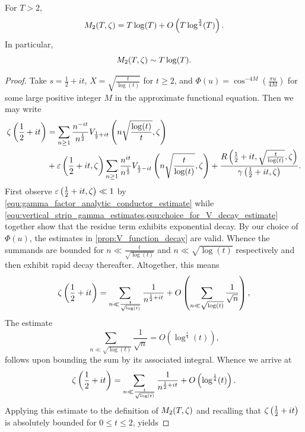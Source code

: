     \begin{theorem}\label{thm:second_moment_of_Riemann_zeta_asymptotic_equivalence}
      For \(T > 2\),
      \[
        M_{2}(T,\zeta) = T\log(T)+O\left(T\log^{\frac{3}{4}}(T)\right).
      \]
      In particular,
      \[
        M_{2}(T,\zeta) \sim T\log(T).
      \]
    \end{theorem}
    \begin{proof}
      Take \(s = \frac{1}{2}+it\), \(X = \sqrt{\frac{t}{\log(t)}}\) for \(t \ge 2\), and \(\Phi(u) = \cos^{-4M}\left(\frac{\pi u}{4M}\right)\) for some large positive integer \(M\) in the approximate functional equation. Then we may write
      \begin{align*}
        \zeta\left(\frac{1}{2}+it\right) &= \sum_{n \ge 1}\frac{n^{-it}}{n^{\frac{1}{2}}}V_{\frac{1}{2}+it}\left(n\sqrt{\frac{\log(t)}{t}},\zeta\right) \\
        &+ \varepsilon\left(\frac{1}{2}+it,\zeta\right)\sum_{n \ge 1}\frac{n^{it}}{n^{\frac{1}{2}}}V_{\frac{1}{2}-it}\left(n\sqrt{\frac{t}{\log(t)}},\zeta\right)+\frac{R\left(\frac{1}{2}+it,\sqrt{\frac{t}{\log(t)}},\zeta\right)}{\gamma\left(\frac{1}{2}+it,\zeta\right)}.
      \end{align*}
      First observe \(\varepsilon\left(\frac{1}{2}+it,\zeta\right) \ll 1\) by \cref{equ:gamma_factor_analytic_conductor_estimate} while \cref{equ:vertical_strip_gamma_estimates,equ:choice_for_V_decay_estimate} together show that the residue term exhibits exponential decay. By our choice of \(\Phi(u)\), the estimates in \cref{prop:V_function_decay} are valid. Whence the summands are bounded for \(n \ll \frac{t}{\sqrt{\log(t)}}\) and \(n \ll \sqrt{\log(t)}\) respectively and then exhibit rapid decay thereafter. Altogether, this means
      \[
        \zeta\left(\frac{1}{2}+it\right) = \sum_{n \ll \frac{t}{\sqrt{\log(t)}}}\frac{1}{n^{\frac{1}{2}+it}}+O\left(\sum_{n \ll \sqrt{\log(t)}}\frac{1}{\sqrt{n}}\right),
      \]
      The estimate
      \[
        \sum_{n \ll \sqrt{\log(t)}}\frac{1}{\sqrt{n}} = O\left(\log^{\frac{1}{4}}(t)\right),
      \]
      follows upon bounding the sum by its associated integral. Whence we arrive at
      \begin{equation}\label{equ:second_moment_zeta_asymptotic_equivalence_1}
        \zeta\left(\frac{1}{2}+it\right) = \sum_{n \ll \frac{t}{\sqrt{\log(t)}}}\frac{1}{n^{\frac{1}{2}+it}}+O\left(\log^{\frac{1}{4}}(t)\right).
      \end{equation}
      Applying this estimate to the definition of \(M_{2}(T,\zeta)\) and recalling that \(\zeta\left(\frac{1}{2}+it\right)\) is absolutely bounded for \(0 \le t \le 2\), yields

\end{proof}

